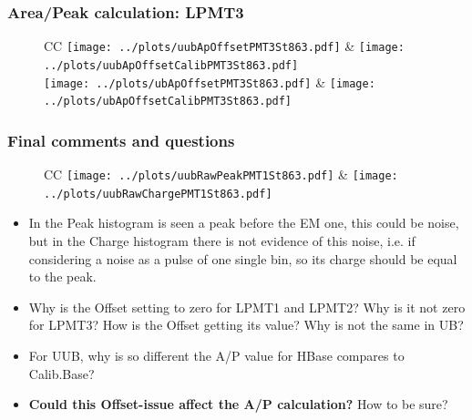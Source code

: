 \documentclass[aspectratio=169]{beamer}
\begin{document}
\begin{frame}
	\frametitle{Area/Peak calculation: LPMT3}
	
	\begin{figure}
		\centering
		\begin{tabularx}{\textwidth}{CC}
			\texttt{[image: ../plots/uubApOffsetPMT3St863.pdf]}
			&
			\texttt{[image: ../plots/uubApOffsetCalibPMT3St863.pdf]}
			\\
			\texttt{[image: ../plots/ubApOffsetPMT3St863.pdf]}
			&
			\texttt{[image: ../plots/ubApOffsetCalibPMT3St863.pdf]}
			\\
		\end{tabularx}
	\end{figure}
\end{frame}



\begin{frame}
	\frametitle{Final comments and questions}
	
	\begin{figure}
		\centering
		\begin{tabularx}{\textwidth}{CC}
			\texttt{[image: ../plots/uubRawPeakPMT1St863.pdf]}
			&
			\texttt{[image: ../plots/uubRawChargePMT1St863.pdf]}
		\end{tabularx}
	\end{figure}

	\begin{itemize}
		\item In the Peak histogram is seen a peak before the EM one, this could 
			be noise, but in the Charge histogram there is not evidence of this noise,
			i.e. if considering a noise as a pulse of one single bin, so its charge 
			should be equal to the peak.
			\vspace{0.1cm}
		\item Why is the Offset setting to zero for LPMT1 and LPMT2? Why is it not
			zero for LPMT3? How is the Offset getting its value? Why is not the same 
			in UB?
			\vspace{0.1cm}
		\item For UUB, why is so different the A/P value for HBase compares to 
			Calib.Base?
			\vspace{0.1cm}
		\item {\bf Could this Offset-issue affect the A/P calculation?} How to be 
			sure?
	\end{itemize}
\end{frame}
\end{document}
